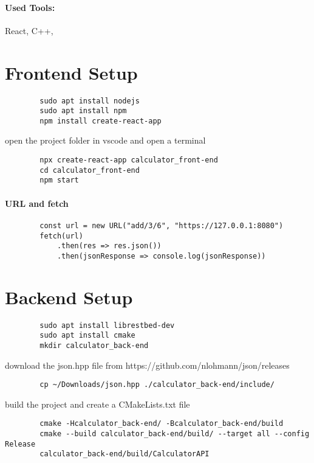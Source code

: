 \documentclass{article}
\begin{document}
	
	\paragraph{Used Tools:} React, C++,
	
	\section{Frontend Setup}
	\begin{verbatim}
		sudo apt install nodejs
		sudo apt install npm
		npm install create-react-app 
	\end{verbatim}
	open the project folder in vscode and open a terminal
	\begin{verbatim}
		npx create-react-app calculator_front-end
		cd calculator_front-end
		npm start
	\end{verbatim}
	
	\paragraph{URL and fetch} 
	\begin{verbatim}
		const url = new URL("add/3/6", "https://127.0.0.1:8080")
		fetch(url)
			.then(res => res.json())
			.then(jsonResponse => console.log(jsonResponse)) 
	\end{verbatim}
	
	\section{Backend Setup}
	\begin{verbatim}
		sudo apt install librestbed-dev
		sudo apt install cmake
		mkdir calculator_back-end
	\end{verbatim}
	download the json.hpp file from https://github.com/nlohmann/json/releases
	\begin{verbatim}
		cp ~/Downloads/json.hpp ./calculator_back-end/include/
	\end{verbatim}
	build the project and create a CMakeLists.txt file
	\begin{verbatim}
		cmake -Hcalculator_back-end/ -Bcalculator_back-end/build
		cmake --build calculator_back-end/build/ --target all --config Release
		calculator_back-end/build/CalculatorAPI 
	\end{verbatim}
\end{document}
